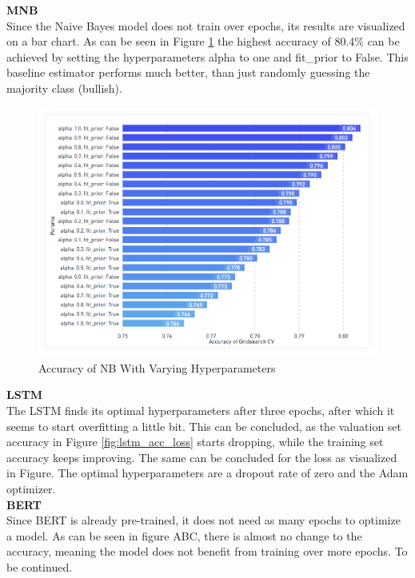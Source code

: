 \documentclass[11pt, a4paper]{article}
\begin{document}
\noindent\textbf{MNB}\\
Since the Naive Bayes model does not train over epochs, its results are visualized on a bar chart. As can be seen in Figure \ref{fig:nb_hyperparam} the
highest accuracy of 80.4\% can be achieved by setting the hyperparameters alpha to one and fit\_prior to False. This baseline estimator
performs much better, than just randomly guessing the majority class (bullish). \\

\begin{figure}[!htb]
    \centering
    \includegraphics[scale=0.5]{NB_hyperparam.png}
    \caption{Accuracy of NB With Varying Hyperparameters}
    \label{fig:nb_hyperparam}
\end{figure}


\noindent\textbf{LSTM}\\
The LSTM finds its optimal hyperparameters after three epochs, after which it seems to start overfitting a little bit.
This can be concluded, as the valuation set accuracy in Figure \ref{fig:lstm_acc_loss} starts dropping, while the training set
accuracy keeps improving. The same can be concluded for the loss as visualized in Figure.
The optimal hyperparameters are a dropout rate of zero and the Adam optimizer.\\

\noindent\textbf{BERT}\\
Since BERT is already pre-trained, it does not need as many epochs to optimize a model.
As can be seen in figure ABC, there is almost no change to the accuracy, meaning the model does not benefit from training over more epochs.
To be continued.
\end{document}
